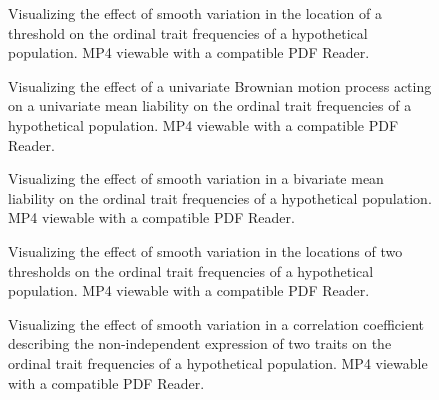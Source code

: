 \documentclass[10pt, twocolumn, twoside]{article}
\begin{document}
\begin{figure}[h]
\centering
{}
\caption[Varying the Location of a Threshold Under the Univariate Threshold Model]{Visualizing the effect of smooth variation in the location of a threshold on the ordinal trait frequencies of a hypothetical population. MP4 viewable with a compatible PDF Reader.}
\label{fig:univThreshSmooth}
\end{figure}

\begin{figure}[h]
\centering
{}
\caption[Univariate Brownian Motion Under the Threshold Model]{Visualizing the effect of a univariate Brownian motion process acting on a univariate mean liability on the ordinal trait frequencies of a hypothetical population. MP4 viewable with a compatible PDF Reader.}
\label{fig:univThreshMeanWiggle}
\end{figure}

\begin{figure}[h]
\centering
{}
\caption[Varying the Location of a Population Mean Under the Bivariate Threshold Model]{Visualizing the effect of smooth variation in a bivariate mean liability on the ordinal trait frequencies of a hypothetical population. MP4 viewable with a compatible PDF Reader.}
\label{fig:bivMuSmooth}
\end{figure}

\begin{figure}[h]
\centering
{}
\caption[Varying the Location of Two Thresholds Under the Bivariate Threshold Model]{Visualizing the effect of smooth variation in  the locations of two thresholds on the ordinal trait frequencies of a hypothetical population. MP4 viewable with a compatible PDF Reader.}
\label{fig:bivThreshSmooth}
\end{figure}

\begin{figure}[h]
\centering
{}
\caption[Varying the Location of a Correlation Coefficient Under the Bivariate Threshold Model]{Visualizing the effect of smooth variation in a correlation coefficient describing the non-independent expression of two traits on the ordinal trait frequencies of a hypothetical population. MP4 viewable with a compatible PDF Reader.}
\label{fig:bivCorrSmooth}
\end{figure}
\end{document}
